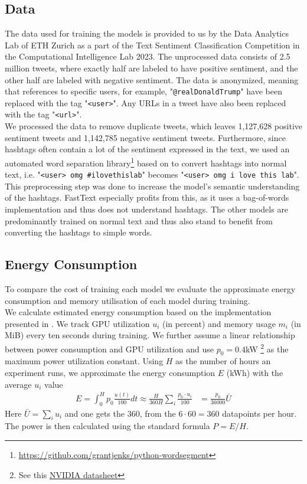 \documentclass[10pt,conference,compsocconf]{IEEEtran}
\begin{document}
\subsection{Data}
The data used for training the models is provided to us by the Data Analytics Lab of ETH Zurich as a part of the Text Sentiment Classification Competition in the Computational Intelligence Lab 2023. The unprocessed data consists of 2.5 million tweets, where exactly half are labeled to have positive sentiment, and the other half are labeled with negative sentiment. The data is anonymized, meaning that references to specific users, for example, "\texttt{@realDonaldTrump}" have been replaced with the tag "\texttt{<user>}". Any URLs in a tweet have also been replaced with the tag "\texttt{<url>}".\\
We processed the data to remove duplicate tweets, which leaves 1,127,628 positive sentiment tweets and 1,142,785 negative sentiment tweets. Furthermore, since hashtags often contain a lot of the sentiment expressed in the text, we used an automated word separation library\footnote{\url{https://github.com/grantjenks/python-wordsegment}} based on \cite{segaran2009beautiful} to convert hashtags into normal text, i.e. "\texttt{<user> omg \#ilovethislab}" becomes "\texttt{<user> omg i love this lab}". This preprocessing step was done to increase the model's semantic understanding of the hashtags. FastText especially profits from this, as it uses a bag-of-words implementation and thus does not understand hashtags. The other models are predominantly trained on normal text and thus also stand to benefit from converting the hashtags to simple words.

\subsection{Energy Consumption}
To compare the cost of training each model we evaluate the approximate energy consumption and memory utilisation of each model during training.\\
We calculate estimated energy consumption based on the implementation presented in \cite{read}. We track GPU utilization $u_i$ (in percent) and memory usage $m_i$ (in MiB) every ten seconds during training. We further assume a linear relationship between power consumption and GPU utilization and use $p_0 = 0.4$kW \footnote{See this \href{https://www.nvidia.com/content/dam/en-zz/Solutions/Data-Center/a100/pdf/nvidia-a100-datasheet-us-nvidia-1758950-r4-web.pdf}{NVIDIA datasheet}} as the maximum power utilization constant. Using $H$ as the number of hours an experiment runs, we approximate the energy consumption $E$ (kWh) with the average $u_i$ value
\begin{align}
    E = \int_0^H  p_0 \frac{u(t)}{100}dt
    \approx \frac{H}{360H}\sum_i \frac{p_0 \cdot u_i}{100}
    &= \frac{p_0}{36000} \bar U
\end{align}
Here $\bar U=\sum_i u_i$ and one gets the 360, from the $6 \cdot 60 = 360$ datapoints per hour. The power is then calculated using the standard formula $P=E/H$.
\end{document}
